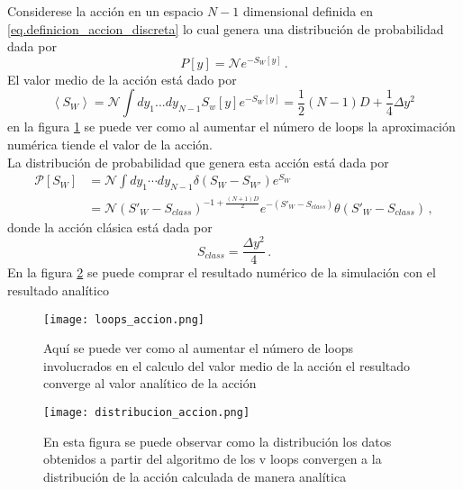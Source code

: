 Considerese la acción en un espacio $N-1$ dimensional definida en \eqref{eq.definicion_accion_discreta} lo cual genera una distribución de probabilidad dada por 
\begin{equation}
P [y] = \mathcal{N} e^{-S _{W} [y]}
\, .
\end{equation}
El valor medio de la acción está dado por
\begin{equation}
\left< S _W \right> = 
\mathcal{N} \int dy _1 ... dy _{N-1} S _w [y] e^{-S _{W} [y]} =
\frac{1}{2} (N-1) D + \frac{1}{4} \Delta y ^2 
\,
\end{equation}
en la figura \ref{fig:convergencia_loops} se puede ver como al aumentar el número de loops la aproximación numérica tiende el valor de la acción. \\



La distribución de probabilidad que genera esta acción está dada por
\begin{align}
\mathcal{P} [S _W] &=  \mathcal{N} \int d y_1 \dotsb d y_{N-1} \delta \left( S_W - S_{W'}  \right) e ^{S_W}  \\
&=
 \mathcal{N} \left(  S' _W - S_{class} \right) ^{-1 + \frac{(N+1) D}{2}}
e ^{-\left( S' _W - S_{class} \right)}
\theta \left( S ' _W - S _{class} \right)
\, ,
\nonumber
\end{align}
donde la acción clásica está dada por
\begin{equation}
S _{class} = \frac{\Delta y ^2}{ 4}
\, .
\end{equation}
En la figura \ref{fig:distribucion_accion_cap4} se puede comprar el resultado numérico de la simulación con el resultado analítico 




\begin{figure}
    \centering
    \texttt{[image: loops\_accion.png]}
    \caption{Aquí se puede ver como al aumentar el número de loops involucrados en el calculo del valor medio de la acción el resultado converge al valor analítico de la acción}
    \label{fig:convergencia_loops}
\end{figure}

\begin{figure}
    \centering
    \texttt{[image: distribucion\_accion.png]}
    \caption{En esta figura se puede observar como la distribución los datos obtenidos a partir del algoritmo de los v loops convergen a la distribución de la acción calculada de manera analítica}
    \label{fig:distribucion_accion_cap4}
\end{figure}




